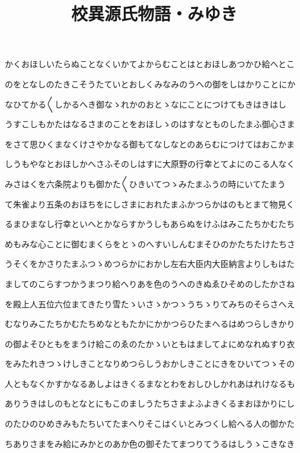 \documentclass[a4paper,11pt,landscape]{ltjtarticle}
\title{校異源氏物語・みゆき}
\date{}
\begin{document}
\maketitle

かくおほしいたらぬことなくいかてよからむことはとおほしあつかひ給へとこ
\par\medskip
のをとなしのたきこそうたていとおしくみなみのうへの御をしはかりことにか
\par\medskip
なひてかる〱しかるへき御なゝれかのおとゝなにことにつけてもきはきはし
\par\medskip
うすこしもかたはなるさまのことをおほしゝのはすなとものしたまふ御心さま
\par\medskip
をさて思ひくまなくけさやかなる御もてなしなとのあらむにつけてはおこかま
\par\medskip
しうもやなとおほしかへさふそのしはすに大原野の行幸とてよにのこる人なく
\par\medskip
みさはくを六条院よりも御かた〱ひきいてつゝみたまふうの時にいてたまう
\par\medskip
て朱雀より五条のおほちをにしさまにおれたまふかつらかはのもとまて物見く
\par\medskip
るまひまなし行幸といへとかならすかうしもあらぬをけふはみこたちかむたち
\par\medskip
めもみな心ことに御むまくらをとゝのへすいしんむまそひのかたちたけたちさ
\par\medskip
うそくをかさりたまふつゝめつらかにおかし左右大臣内大臣納言よりしもはた
\par\medskip
ましてのこらすつかうまつり給へりあを色のうへのきぬゑひそめのしたかさね
\par\medskip
を殿上人五位六位まてきたり雪たゝいさゝかつゝうちゝりてみちのそらさへえ
\par\medskip
むなりみこたちかむたちめなともたかにかかつらひたまへるはめつらしきかり
\par\medskip
の御よそひともをまうけ給このゑのたかゝいともはましてよにめなれぬすり衣
\par\medskip
をみたれきつゝけしきことなりめつらしうおかしきことにきをひいてつゝその
\par\medskip
人ともなくかすかなるあしよはきくるまなとわをおしひしかれあはれけなるも
\par\medskip
ありうきはしのもとなとにもこのましうたちさまよふよきくるまおほかりにし
\par\medskip
のたひのひめきみもたちいてたまへりそこはくいとみつくし給へる人の御かた
\par\medskip
ちありさまをみ給にみかとのあか色の御そたてまつりてうるはしうゝこきなき
\end{document}
